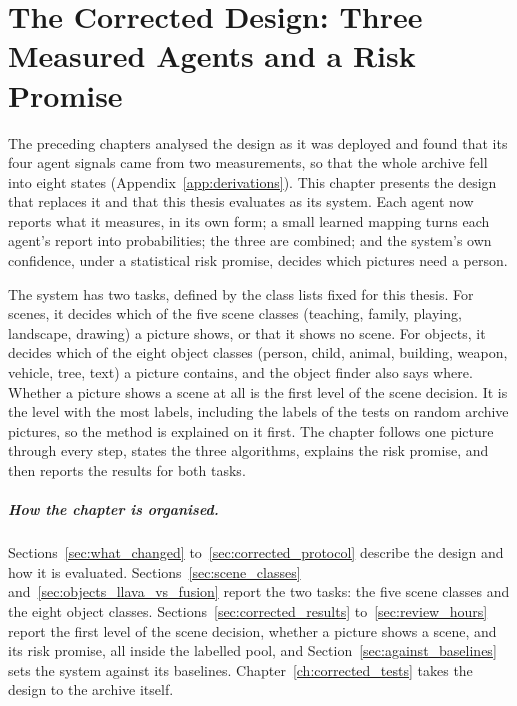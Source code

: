 
\chapter{The Corrected Design: Three Measured Agents and a Risk Promise}
\label{ch:corrected_design}

The preceding chapters analysed the design as it was deployed and found that its four agent signals came from two measurements, so that the whole archive fell into eight states (Appendix~\ref{app:derivations}). This chapter presents the design that replaces it and that this thesis evaluates as its system. Each agent now reports what it measures, in its own form; a small learned mapping turns each agent's report into probabilities; the three are combined; and the system's own confidence, under a statistical risk promise, decides which pictures need a person.

The system has two tasks, defined by the class lists fixed for this thesis. For scenes, it decides which of the five scene classes (teaching, family, playing, landscape, drawing) a picture shows, or that it shows no scene. For objects, it decides which of the eight object classes (person, child, animal, building, weapon, vehicle, tree, text) a picture contains, and the object finder also says where. Whether a picture shows a scene at all is the first level of the scene decision. It is the level with the most labels, including the labels of the tests on random archive pictures, so the method is explained on it first. The chapter follows one picture through every step, states the three algorithms, explains the risk promise, and then reports the results for both tasks.

\paragraph{How the chapter is organised.} Sections~\ref{sec:what_changed} to~\ref{sec:corrected_protocol} describe the design and how it is evaluated. Sections~\ref{sec:scene_classes} and~\ref{sec:objects_llava_vs_fusion} report the two tasks: the five scene classes and the eight object classes. Sections~\ref{sec:corrected_results} to~\ref{sec:review_hours} report the first level of the scene decision, whether a picture shows a scene, and its risk promise, all inside the labelled pool, and Section~\ref{sec:against_baselines} sets the system against its baselines. Chapter~\ref{ch:corrected_tests} takes the design to the archive itself.

